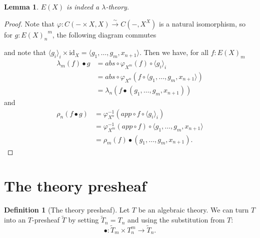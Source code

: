 \documentclass[a4paper]{amsbook}
\newtheorem{lemma}{Lemma}
\theoremstyle{definition}
\newtheorem{definition}{Definition}
\theoremstyle{remark}
\newcommand{\id}[1]{\ensuremath{\text{id}_{#1}}}
\begin{document}
  \begin{lemma}
    $ E(X) $ is indeed a $ \lambda $-theory.
  \end{lemma}
  \begin{proof}
    Note that $ \varphi: C(- \times X, X) \xrightarrow{\sim} C(-, X^X) $ is a natural isomorphism, so for $ g: {E(X)_n}^m $, the following diagram commutes
    \begin{center}
    \end{center}
    and note that $ \langle g_i \rangle_i \times \id X = \langle g_1, \dots, g_m, x_{n + 1} \rangle $. Then we have, for all $ f: E(X)_m $
    \begin{align*}
      \lambda_m(f) \bullet g &= abs \circ \varphi_{X^m}(f) \circ \langle g_i \rangle_i\\
      &= abs \circ \varphi_{X^n}(f \circ \langle g_1, \dots, g_m, x_{n + 1} \rangle)\\
      &= \lambda_n(f \bullet (g_1, \dots, g_m, x_{n + 1}))
    \end{align*}
    and
    \begin{align*}
      \rho_n(f \bullet g) &= \varphi_{X^n}^{-1}(app \circ f \circ \langle g_i \rangle_i)\\
      &= \varphi_{X^m}^{-1}(app \circ f) \circ \langle g_1, \dots, g_m, x_{n + 1} \rangle\\
      &= \rho_m(f) \bullet (g_1, \dots, g_m, x_{n + 1}).
    \end{align*}
  \end{proof}

  \section{The theory presheaf}

  \begin{definition}[The theory presheaf]
    Let $ T $ be an algebraic theory. We can turn $ T $ into an $ T $-presheaf $ \tilde T $ by setting $ \tilde T_n = T_n $ and using the substitution from $ T $:
    \[ \bullet: \tilde T_m \times T_n^m \to \tilde T_n. \]
  \end{definition}
\end{document}

